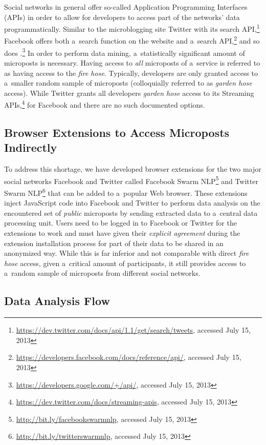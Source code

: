 Social networks in general offer so-called
Application Programming Interfaces (APIs)
in order to allow for developers to access
part of the networks' data programmatically.
Similar to the microblogging site Twitter
with its search
API,\footnote{\url{https://dev.twitter.com/docs/api/1.1/get/search/tweets},
accessed July 15, 2013}
Facebook offers both a~search function on the website
and a~search
API,\footnote{\url{https://developers.facebook.com/docs/reference/api/},
accessed July 15, 2013}
and so does
\googleplus.\footnote{\url{https://developers.google.com/+/api/},
accessed July 15, 2013}
In order to perform data mining,
a~statistically significant amount of microposts is necessary.
Having access to \emph{all} microposts of a~service is referred to as
having access to the \emph{fire hose}.
Typically, developers are only granted access to a~smaller random
sample of microposts (colloquially referred to as \emph{garden hose} access).
While Twitter grants all developers \emph{garden hose} access to its Streaming
APIs,\footnote{\url{https://dev.twitter.com/docs/streaming-apis},
accessed July 15, 2013}
for Facebook and \googleplus there are no such documented options.

\subsection{Browser Extensions to Access Microposts Indirectly}

To address this shortage, we have developed browser extensions
for the two major social networks Facebook and Twitter
called Facebook Swarm
NLP\footnote{\url{http://bit.ly/facebookswarmnlp},
accessed July 15, 2013}
and Twitter Swarm
NLP\footnote{\url{http://bit.ly/twitterswarmnlp},
accessed July 15, 2013}
that can be added to a~popular Web browser.
These extensions inject JavaScript code into Facebook and
Twitter to perform data analysis on the encountered set of
\emph{public} microposts by sending extracted data
to a~central data processing unit.
Users need to be logged in to Facebook or Twitter for the
extensions to work and must have given
their \emph{explicit agreement} during
the extension installation process
for part of their data to be shared in an anonymized way.
While this is far inferior and not comparable
with direct \emph{fire hose} access,
given a~critical amount of participants,
it still provides access to a~random sample of microposts
from different social networks.

\subsection{Data Analysis Flow}

